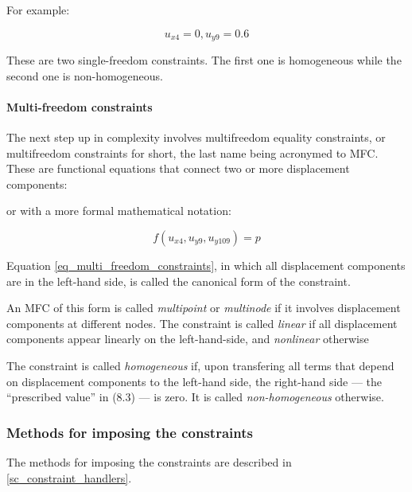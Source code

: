 \begin{center}
\end{center}

\noindent For example:

\begin{equation}
  u_{x4}= 0, u_{y9}= 0.6
\end{equation}

\noindent These are two single-freedom constraints.  The first one is homogeneous while the second one is non-homogeneous.

\paragraph{Multi-freedom constraints}
The next step up in complexity involves multifreedom equality constraints, or multifreedom constraints for short,  the last name being acronymed to MFC. These are functional equations that connect two or more displacement components:

\begin{center}
\end{center}

\noindent or with a more formal mathematical notation:

\begin{equation}\label{eq_multi_freedom_constraints}
f(u_{x4}, u_{y9}, u_{y109})= p
\end{equation}

Equation \ref{eq_multi_freedom_constraints}, in which all displacement components are in the left-hand side, is called the canonical form of the constraint.

An MFC of this form is called \emph{multipoint} or \emph{multinode} if it involves displacement components at different nodes.  The constraint is called \emph{linear} if all displacement components appear linearly on the left-hand-side, and \emph{nonlinear} otherwise

The constraint is called \emph{homogeneous} if, upon transfering all terms that depend on displacement components to the left-hand side, the right-hand side — the ``prescribed value'' in (8.3) — is zero. It is called \emph{non-homogeneous} otherwise.

\subsubsection{Methods for imposing the constraints}
The methods for imposing the constraints are described in \ref{sc_constraint_handlers}.





